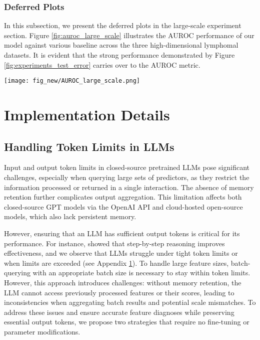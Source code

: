 \subsubsection{Deferred Plots}\label{subsec:deferred_plot}
In this subsection, we present the deferred plots in the large-scale experiment section. Figure \ref{fig:auroc_large_scale} illustrates the AUROC performance of our model against various baseline across the three high-dimensional lymphomal datasets. It is evident that the strong performance demonstrated by Figure \ref{fig:experiments_test_error} carries over to the AUROC metric.
\begin{figure*}[h!]
    \centering
    \texttt{[image: fig\_new/AUROC\_large\_scale.png]}
    \caption{AUROC performance across 10 splits for the lymphoma datasets.}
    \label{fig:auroc_large_scale}
\end{figure*}


\section{Implementation Details}\label{appdx:imp}

\subsection{Handling Token Limits in LLMs}\label{subsec:token}
Input and output token limits in closed-source pretrained LLMs pose significant challenges, especially when querying large sets of predictors, as they restrict the information processed or returned in a single interaction. The absence of memory retention further complicates output aggregation. This limitation affects both closed-source GPT models via the OpenAI API and cloud-hosted open-source models, which also lack persistent memory.

However, ensuring that an LLM has sufficient output tokens is critical for its performance. For instance, \cite{wei2022chain} showed that step-by-step reasoning improves effectiveness, and we observe that LLMs struggle under tight token limits or when limits are exceeded (see Appendix \ref{appdx:imp}). To handle large feature sizes, batch-querying with an appropriate batch size is necessary to stay within token limits. However, this approach introduces challenges: without memory retention, the LLM cannot access previously processed features or their scores, leading to inconsistencies when aggregating batch results and potential scale mismatches. To address these issues and ensure accurate feature diagnoses while preserving essential output tokens, we propose two strategies that require no fine-tuning or parameter modifications.

